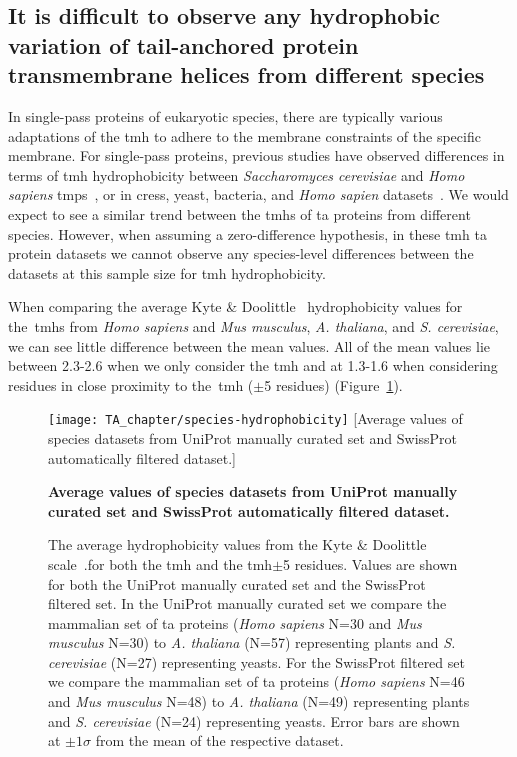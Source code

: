 \subsection{It is difficult to observe any hydrophobic variation of tail\--anchored protein transmembrane helices from different species}

In single\--pass proteins of eukaryotic species, there are typically various adaptations of the \gls{tmh} to adhere to the membrane constraints of the specific membrane.
For single\--pass proteins, previous studies have observed differences in terms of \gls{tmh} hydrophobicity between \textit{Saccharomyces cerevisiae} and \textit{Homo sapiens} \gls{tmp}s~\cite{Sharpe2010}, or in cress, yeast, bacteria, and \textit{Homo sapien} datasets~\cite{Baker2017}.
We would expect to see a similar trend between the \gls{tmh}s of \gls{ta} proteins from different species.
However, when assuming a zero-difference hypothesis, in these \gls{tmh} \gls{ta} protein datasets we cannot observe any species-level differences between the datasets at this sample size for \gls{tmh} hydrophobicity.

When comparing the average Kyte \& Doolittle~\cite{Kyte1982} hydrophobicity values for the~\gls{tmh}s from \textit{Homo sapiens} and \textit{Mus musculus}, \textit{A. thaliana}, and  \textit{S. cerevisiae}, we can see little difference between the mean values.
All of the mean values lie between 2.3-2.6 when we only consider the \gls{tmh} and at 1.3-1.6 when considering residues in close proximity to the~\gls{tmh} ($\pm$5 residues) (Figure~\ref{fig:average_species_hydrophobicity_ta}).

\begin{figure}[!ht]
\centering
\texttt{[image: TA\_chapter/species-hydrophobicity]}
[Average values of species datasets from UniProt manually curated set and SwissProt automatically filtered dataset.]
{\textbf{Average values of species datasets from UniProt manually curated set and SwissProt automatically filtered dataset.}

The average hydrophobicity values from the Kyte \& Doolittle scale~\cite{Kyte1982}.for both the \gls{tmh} and the \gls{tmh}$\pm$5 residues.
Values are shown for both the UniProt manually curated set and the SwissProt filtered set. In the UniProt manually curated set we compare the mammalian set of \gls{ta} proteins (\textit{Homo sapiens} N=30 and \textit{Mus musculus} N=30) to \textit{A. thaliana} (N=57) representing plants and \textit{S. cerevisiae} (N=27) representing yeasts. For the SwissProt filtered set we compare the mammalian set of \gls{ta} proteins (\textit{Homo sapiens} N=46 and \textit{Mus musculus} N=48) to \textit{A. thaliana} (N=49) representing plants  and  \textit{S. cerevisiae} (N=24) representing yeasts.
Error bars are shown at $\pm 1 \sigma$ from the mean of the respective dataset.
}

\label{fig:average_species_hydrophobicity_ta}
\end{figure}

